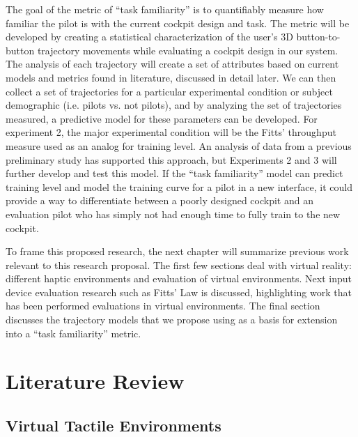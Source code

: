 The goal of the metric of ``task familiarity'' is to quantifiably measure how familiar the pilot is with the current cockpit design and task. The metric will be developed by creating a statistical characterization of the user's 3D button-to-button trajectory movements while evaluating a cockpit design in our system. The analysis of each trajectory will create a set of attributes based on current models and metrics found in literature, discussed in detail later. We can then collect a set of trajectories for a particular experimental condition or subject demographic (i.e. pilots vs. not pilots), and by analyzing the set of trajectories measured, a predictive model for these parameters can be developed. For experiment 2, the major experimental condition will be the Fitts' throughput measure used as an analog for training level. An analysis of data from a previous preliminary study has supported this approach, but Experiments 2 and 3 will further develop and test this model. If the ``task familiarity'' model can predict training level and model the training curve for a pilot in a new interface, it could provide a way to differentiate between a poorly designed cockpit and an evaluation pilot who has simply not had enough time to fully train to the new cockpit.

To frame this proposed research, the next chapter will summarize previous work relevant to this research proposal. The first few sections deal with virtual reality: different haptic environments and evaluation of virtual environments. Next input device evaluation research such as Fitts' Law is discussed, highlighting work that has been performed evaluations in virtual environments. The final section discusses the trajectory models that we propose using as a basis for extension into a ``task familiarity''
metric.

\section{Literature Review}
\label{literature-review}

\subsection{Virtual Tactile Environments}
\label{virtual-tactile-environments}

